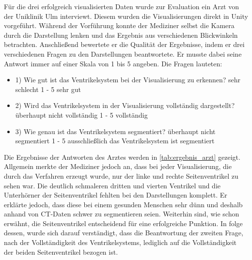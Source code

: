 Für die drei erfolgreich visualisierten Daten wurde zur Evaluation ein Arzt von der Uniklinik Ulm interviewt. Diesem wurden die Visualisierungen direkt in Unity vorgeführt. Während der Vorführung konnte der Mediziner selbst die Kamera durch die Darstellung lenken und das Ergebnis aus verschiedenen Blickwinkeln betrachten.
\newline
Anschließend bewertete er die Qualität der Ergebnisse, indem er drei verschiedenen Fragen zu den Darstellungen beantwortete. Er musste dabei seine Antwort immer auf einer Skala von 1 bis 5 angeben.
\newline
Die Fragen lauteten:
\begin{itemize}
	\item 1) Wie gut ist das Ventrikelsystem bei der Visualisierung zu erkennen? \newline sehr schlecht 1 - 5 sehr gut
	\item 2) Wird das Ventrikelsystem in der Visualisierung vollständig dargestellt? \newline überhaupt nicht vollständig 1 - 5 vollständig
	\item 3) Wie genau ist das Ventrikelsystem segmentiert? \newline überhaupt nicht segmentiert 1 - 5 ausschließlich das Ventrikelsystem ist segmentiert
\end{itemize}


Die Ergebnisse der Antworten des Arztes werden in \autoref{tab:ergebnis_arzt} gezeigt. Allgemein merkte der Mediziner jedoch an, dass bei jeder Visualisierung, die durch das Verfahren erzeugt wurde, nur der linke und rechte Seitenventrikel zu sehen war. Die deutlich schmaleren dritten und vierten Ventrikel und die Unterhörner der Seitenventrikel fehlten bei den Darstellungen komplett.
\newline
Er erklärte jedoch, dass diese bei einem gesunden Menschen sehr dünn und deshalb anhand von CT-Daten schwer zu segmentieren seien. Weiterhin sind, wie schon erwähnt, die Seitenventrikel entscheidend für eine erfolgreiche Punktion.
\newline
In folge dessen, wurde sich darauf verständigt, dass die Beantwortung der zweiten Frage, nach der Vollständigkeit des Ventrikelsystems, lediglich auf die Vollständigkeit der beiden Seitenventrikel bezogen ist.

\begin{table}[h]
\centering
\tiny
{}
\caption{Ergebnisse des Interviews mit einem Arzt}
\label{tab:ergebnis_arzt}
\end{table}


